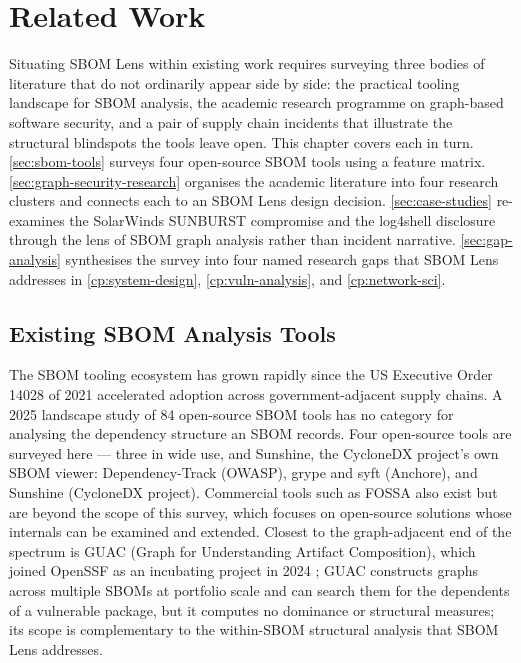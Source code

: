 \chapter[Related Work]{Related Work}
\label{cp:related-work}

Situating SBOM Lens within existing work requires surveying three bodies of literature that do not ordinarily appear side by side: the practical tooling landscape for SBOM analysis, the academic research programme on graph-based software security, and a pair of supply chain incidents that illustrate the structural blindspots the tools leave open. This chapter covers each in turn. \autoref{sec:sbom-tools} surveys four open-source SBOM tools using a feature matrix. \autoref{sec:graph-security-research} organises the academic literature into four research clusters and connects each to an SBOM Lens design decision. \autoref{sec:case-studies} re-examines the SolarWinds SUNBURST compromise and the log4shell disclosure through the lens of SBOM graph analysis rather than incident narrative. \autoref{sec:gap-analysis} synthesises the survey into four named research gaps that SBOM Lens addresses in \autoref{cp:system-design}, \autoref{cp:vuln-analysis}, and \autoref{cp:network-sci}.


\section{Existing SBOM Analysis Tools}
\label{sec:sbom-tools}

The SBOM tooling ecosystem has grown rapidly since the US Executive Order 14028 of 2021 accelerated adoption across government-adjacent supply chains. A 2025 landscape study of 84 open-source SBOM tools \citep{Garcia2025} has no category for analysing the dependency structure an SBOM records. Four open-source tools are surveyed here --- three in wide use, and Sunshine, the CycloneDX project's own SBOM viewer: Dependency-Track (OWASP), grype and syft (Anchore), and Sunshine (CycloneDX project). Commercial tools such as FOSSA also exist but are beyond the scope of this survey, which focuses on open-source solutions whose internals can be examined and extended. Closest to the graph-adjacent end of the spectrum is GUAC (Graph for Understanding Artifact Composition), which joined OpenSSF as an incubating project in 2024 \citep{GUAC2024}; GUAC constructs graphs across multiple SBOMs at portfolio scale and can search them for the dependents of a vulnerable package, but it computes no dominance or structural measures; its scope is complementary to the within-SBOM structural analysis that SBOM Lens addresses.

